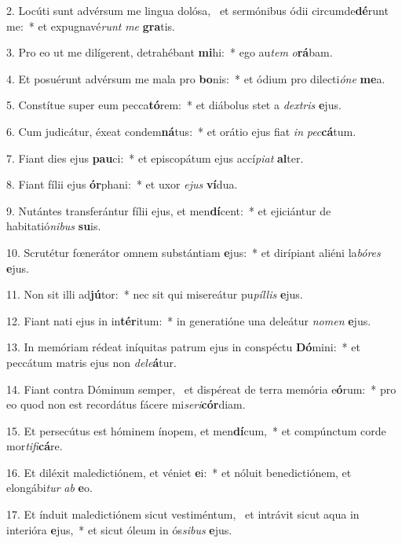 2. Locúti sunt advérsum me lingua dolósa, \dag\  et sermónibus ódii circumde\textbf{dé}runt me:~*  et expugnavé\textit{runt} \textit{me} \textbf{gra}tis.\

3. Pro eo ut me dilígerent, detrahébant \textbf{mi}hi:~*  ego au\textit{tem} \textit{o}\textbf{rá}bam.\

4. Et posuérunt advérsum me mala pro \textbf{bo}nis:~*  et ódium pro dilecti\textit{ó}\textit{ne} \textbf{me}a.\

5. Constítue super eum pecca\textbf{tó}rem:~*  et diábolus stet a \textit{dex}\textit{tris} \textbf{e}jus.\

6. Cum judicátur, éxeat condem\textbf{ná}tus:~*  et orátio ejus fiat \textit{in} \textit{pec}\textbf{cá}tum.\

7. Fiant dies ejus \textbf{pau}ci:~*  et episcopátum ejus accí\textit{pi}\textit{at} \textbf{al}ter.\

8. Fiant fílii ejus \textbf{ór}phani:~*  et uxor \textit{e}\textit{jus} \textbf{ví}dua.\

9. Nutántes transferántur fílii ejus, et men\textbf{dí}cent:~*  et ejiciántur de habitatió\textit{ni}\textit{bus} \textbf{su}is.\

10. Scrutétur fœnerátor omnem substántiam \textbf{e}jus:~*  et dirípiant aliéni la\textit{bó}\textit{res} \textbf{e}jus.\

11. Non sit illi ad\textbf{jú}tor:~*  nec sit qui misereátur pu\textit{píl}\textit{lis} \textbf{e}jus.\

12. Fiant nati ejus in in\textbf{tér}itum:~*  in generatióne una deleátur \textit{no}\textit{men} \textbf{e}jus.\

13. In memóriam rédeat iníquitas patrum ejus in conspéctu \textbf{Dó}mini:~*  et peccátum matris ejus non \textit{de}\textit{le}\textbf{á}tur.\

14. Fiant contra Dóminum semper, \dag\  et dispéreat de terra memória e\textbf{ó}rum:~*  pro eo quod non est recordátus fácere mi\textit{se}\textit{ri}\textbf{cór}diam.\

15. Et persecútus est hóminem ínopem, et men\textbf{dí}cum,~*  et compúnctum corde mor\textit{ti}\textit{fi}\textbf{cá}re.\

16. Et diléxit maledictiónem, et véniet \textbf{e}i:~*  et nóluit benedictiónem, et elongábi\textit{tur} \textit{ab} \textbf{e}o.\

17. Et índuit maledictiónem sicut vestiméntum, \dag\  et intrávit sicut aqua in interióra \textbf{e}jus,~*  et sicut óleum in ós\textit{si}\textit{bus} \textbf{e}jus.\

